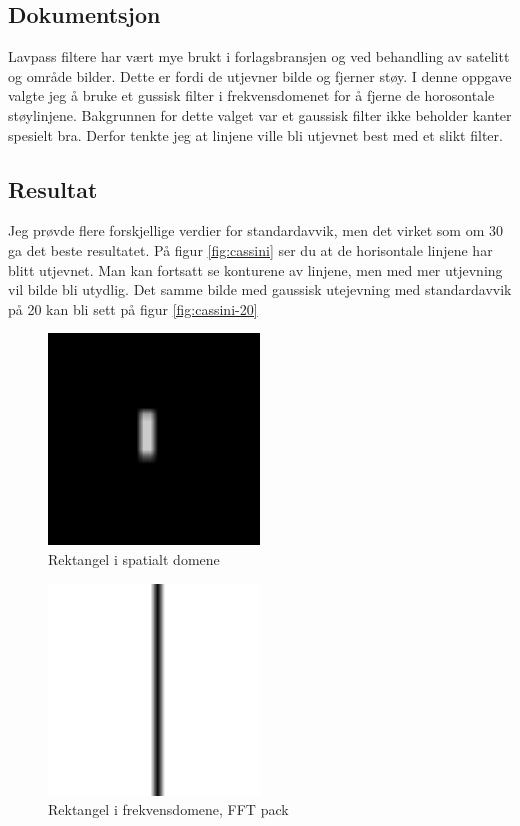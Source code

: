 \documentclass[a4paper, 12pt]{article}
\begin{document}
\subsection{Dokumentsjon}
Lavpass filtere har vært mye brukt i forlagsbransjen og ved behandling av satelitt og område bilder. Dette er fordi de utjevner bilde og fjerner støy. I denne oppgave valgte jeg å bruke et gussisk filter i frekvensdomenet for å fjerne de horosontale støylinjene. Bakgrunnen for dette valget var et gaussisk filter ikke beholder kanter spesielt bra. Derfor tenkte jeg at linjene ville bli utjevnet best med et slikt filter.
\subsection{Resultat}
Jeg prøvde flere forskjellige verdier for standardavvik, men det virket som om 30 ga det beste resultatet. På figur \ref{fig:cassini} ser du at de horisontale linjene har blitt utjevnet. Man kan fortsatt se konturene av linjene, men med mer utjevning vil bilde bli utydlig. Det samme bilde med gaussisk utejevning med standardavvik på 20 kan bli sett på figur \ref{fig:cassini-20}

\begin{figure}[h]
  \centering
  \includegraphics[width=0.5\textwidth]{images/rektangel.png}
  \caption{Rektangel i spatialt domene}
  \label{fig:rektangel}
\end{figure}


\begin{figure}[h]
  \centering
  \includegraphics[width=0.5\textwidth]{images/fftpack-rektangel}
  \caption{Rektangel i frekvensdomene, FFT pack}
  \label{fig:fft}
\end{figure}
\end{document}
